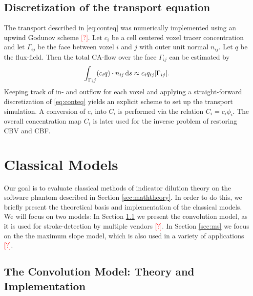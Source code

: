 \documentclass[paper=a4, fontsize=12pt,parskip=half,headings=small]{scrartcl}
\newcommand{\missingsource}{\textcolor{red}{[?]}}
\begin{document}
	\subsection{Discretization of the transport equation} \label{sec:numtrans}
	The transport described in \eqref{eq:conteq} was numerically implemented using an upwind Godunov scheme \missingsource.
	Let $c_i$ be a cell centered voxel tracer concentration and let $\Gamma_{ij}$ be the face between voxel $i$ and $j$ with outer unit normal $n_{ij}$.
	Let $q$ be the flux-field. 
	Then the total CA-flow over the face $\Gamma_{ij}$ can be estimated by
	\[
		\int_{\Gamma_ij} (c_i q)\cdot n_{ij} \,\mathrm{d} s \approx c_i q_{ij} \vert \Gamma_{ij} \vert.
	\]
	Keeping track of in- and outflow for each voxel and applying a straight-forward discretization of \eqref{eq:conteq} yields an explicit scheme to set up the transport simulation.
	A conversion of $c_i$ into $C_i$ is performed via the relation $C_i = c_i\phi_i$. 
	The overall concentration map $C_i$ is later used for the inverse problem of restoring CBV and CBF.



	\section{Classical Models} \label{sec:classical}
	
	Our goal is to evaluate classical methods of indicator dilution theory on the software phantom described in Section \ref{sec:maththeory}.
	In order to do this, we briefly present the theoretical basis and implementation of the classical models.
	We will focus on two models:
	In Section \ref{sec:conv} we present the convolution model, as it is used for stroke-detection by multiple vendors \missingsource.
	In Section \ref{sec:ms} we focus on the the maximum slope model, which is also used in a variety of applications \missingsource.

	\subsection{The Convolution Model: Theory and Implementation}\label{sec:conv}
	
\end{document}
